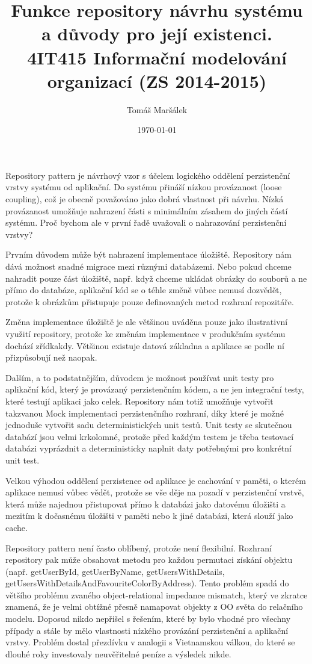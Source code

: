 \documentclass[10pt]{article}
\title{Funkce repository návrhu systému a důvody pro její existenci. \\ 4IT415 Informační modelování organizací (ZS 2014-2015)}
\author{Tomáš Maršálek}
\date{\today}
\begin{document}
\maketitle
\thispagestyle{empty}
\clearpage
{}

Repository pattern je návrhový vzor s účelem logického oddělení perzistenční
vrstvy systému od aplikační. Do systému přináší nízkou provázanost (loose
coupling), což je obecně považováno jako dobrá vlastnost při návrhu. Nízká
provázanost umožňuje nahrazení části s minimálním zásahem do jiných částí
systému. Proč bychom ale v první řadě uvažovali o nahrazování perzistenční
vrstvy?

Prvním důvodem může být nahrazení implementace úložiště. Repository nám dává
možnost snadné migrace mezi různými databázemi. Nebo pokud chceme nahradit
pouze část úložiště, např. když chceme ukládat obrázky do souborů a ne přímo do
databáze, aplikační kód se o téhle změně vůbec nemusí dozvědět, protože k
obrázkům přistupuje pouze definovaných metod rozhraní repozitáře.

Změna implementace úložiště je ale většinou uváděna pouze jako ilustrativní
využití repository, protože ke změnám implementace v produkčním systému dochází
zřídkakdy. Většinou existuje datová základna a aplikace se podle ní
přizpůsobují než naopak.

Dalším, a to podstatnějším, důvodem je možnost používat unit testy pro
aplikační kód, který je provázaný perzistenčním kódem, a ne jen integrační
testy, které testují aplikaci jako celek. Repository nám totiž umožňuje
vytvořit takzvanou Mock implementaci perzistenčního rozhraní, díky které je
možné jednoduše vytvořit sadu deterministických unit testů. Unit testy se
skutečnou databází jsou velmi krkolomné, protože před každým testem je třeba
testovací databázi vyprázdnit a deterministicky naplnit daty potřebnými pro
konkrétní unit test.

Velkou výhodou oddělení perzistence od aplikace je cachování v paměti, o kterém
aplikace nemusí vůbec vědět, protože se vše děje na pozadí v perzistenční
vrstvě, která může najednou přistupovat přímo k databázi jako datovému úložišti
a mezitím k dočasnému úložišti v paměti nebo k jiné databázi, která slouží jako
cache.

Repository pattern není často oblíbený, protože není flexibilní. Rozhraní
repository pak může obsahovat metodu pro každou permutaci získání objektu
(např. getUserById, getUserByName, getUsersWithDetails,
getUsersWithDetailsAndFavouriteColorByAddress). Tento problém spadá do většího
problému zvaného object-relational impedance mismatch, který ve zkratce
znamená, že je velmi obtížné přesně namapovat objekty z OO světa do relačního
modelu. Doposud nikdo nepřišel s řešením, které by bylo vhodné pro všechny
případy a stále by mělo vlastnosti nízkého provázání perzistenční a aplikační
vrstvy. Problém dostal přezdívku  v analogii s
Vietnamskou válkou, do které se dlouhé roky investovaly neuvěřitelné peníze a
výsledek nikde. 
\end{document}
